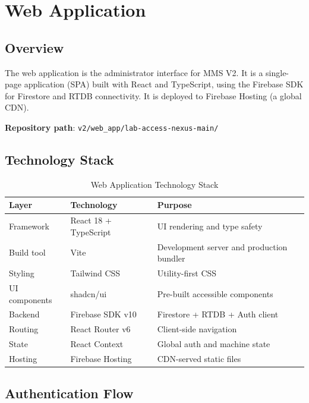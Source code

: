 \chapter{Web Application}
\label{ch:webapp}

\section{Overview}

The web application is the administrator interface for MMS V2. It is a single-page application (SPA) built with React and TypeScript, using the Firebase SDK for Firestore and RTDB connectivity. It is deployed to Firebase Hosting (a global CDN).

\textbf{Repository path}: \texttt{v2/web\_app/lab-access-nexus-main/}

\section{Technology Stack}

\begin{table}[H]
\centering
\caption{Web Application Technology Stack}
\begin{tabular}{L{4cm}L{5cm}L{5.5cm}}
\toprule
\textbf{Layer} & \textbf{Technology} & \textbf{Purpose} \\
\midrule
Framework & React 18 + TypeScript & UI rendering and type safety \\
Build tool & Vite & Development server and production bundler \\
Styling & Tailwind CSS & Utility-first CSS \\
UI components & shadcn/ui & Pre-built accessible components \\
Backend & Firebase SDK v10 & Firestore + RTDB + Auth client \\
Routing & React Router v6 & Client-side navigation \\
State & React Context & Global auth and machine state \\
Hosting & Firebase Hosting & CDN-served static files \\
\bottomrule
\end{tabular}
\end{table}

\section{Authentication Flow}

